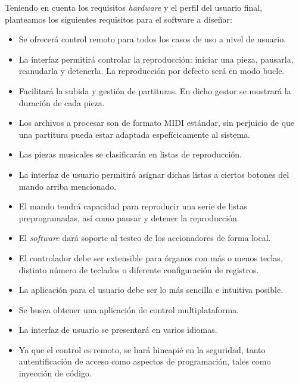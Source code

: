Teniendo en cuenta los requisitos \textit{hardware} y el perfil del usuario final, planteamos los siguientes requisitos para el software a diseñar:

\begin{itemize}

	\item Se ofrecerá control remoto para todos los casos de uso a nivel de usuario.
	
	\item La interfaz permitirá controlar la reproducción: iniciar una pieza, pausarla, reanudarla y detenerla. La reproducción por defecto será en modo bucle.
	
	\item Facilitará la subida y gestión de partituras. En dicho gestor se mostrará la duración de cada pieza.
	
	\item Los archivos a procesar son de formato MIDI estándar, sin perjuicio de que una partitura pueda estar adaptada espefícicamente al sistema.
	
	\item Las piezas musicales se clasificarán en listas de reproducción.
	
	\item La interfaz de usuario permitirá asignar dichas listas a ciertos botones del mando arriba mencionado.
	
	\item El mando tendrá capacidad para reproducir una serie de listas preprogramadas, así como pausar y detener la reproducción.
	
	\item El \textit{software} dará soporte al testeo de los accionadores de forma local.
	
	\item El controlador debe ser extensible para órganos con más o menos teclas, distinto número de teclados o diferente configuración de registros.
	
	\item La aplicación para el usuario debe ser lo más sencilla e intuitiva posible.
	
	\item Se busca obtener una aplicación de control multiplataforma.
	
	\item La interfaz de usuario se presentará en varios idiomas.
	
	\item Ya que el control es remoto, se hará hincapié en la seguridad, tanto autentificación de acceso como aspectos de programación, tales como inyección de código.

\end{itemize}

